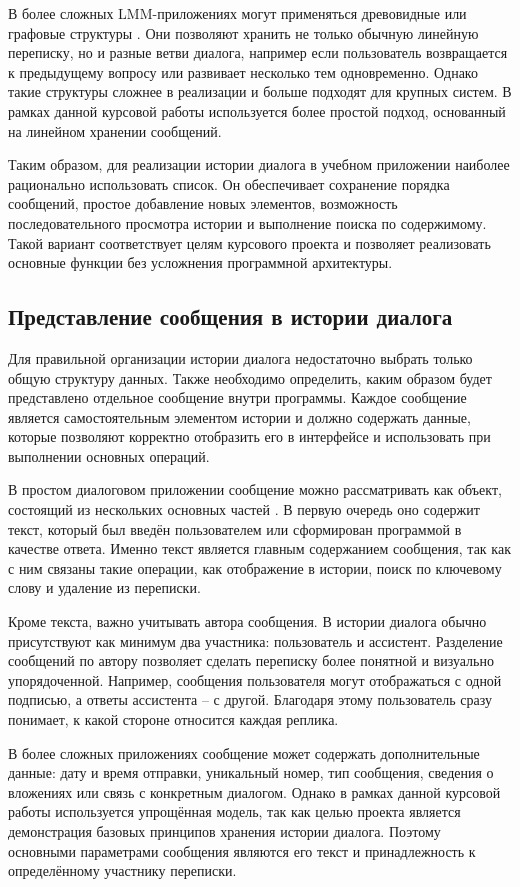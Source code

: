 \documentclass[12pt,a4paper]{article}
\begin{document}
В более сложных LMM-приложениях могут применяться древовидные или графовые структуры \cite{ref1,ref2}. Они позволяют хранить не только обычную линейную переписку, но и разные ветви диалога, например если пользователь возвращается к предыдущему вопросу или развивает несколько тем одновременно. Однако такие структуры сложнее в реализации и больше подходят для крупных систем. В рамках данной курсовой работы используется более простой подход, основанный на линейном хранении сообщений.

Таким образом, для реализации истории диалога в учебном приложении наиболее рационально использовать список. Он обеспечивает сохранение порядка сообщений, простое добавление новых элементов, возможность последовательного просмотра истории и выполнение поиска по содержимому. Такой вариант соответствует целям курсового проекта и позволяет реализовать основные функции без усложнения программной архитектуры.

\subsection{Представление сообщения в истории диалога}

Для правильной организации истории диалога недостаточно выбрать только общую структуру данных. Также необходимо определить, каким образом будет представлено отдельное сообщение внутри программы. Каждое сообщение является самостоятельным элементом истории и должно содержать данные, которые позволяют корректно отобразить его в интерфейсе и использовать при выполнении основных операций.

В простом диалоговом приложении сообщение можно рассматривать как объект, состоящий из нескольких основных частей \cite{ref6,ref7}. В первую очередь оно содержит текст, который был введён пользователем или сформирован программой в качестве ответа. Именно текст является главным содержанием сообщения, так как с ним связаны такие операции, как отображение в истории, поиск по ключевому слову и удаление из переписки.

Кроме текста, важно учитывать автора сообщения. В истории диалога обычно присутствуют как минимум два участника: пользователь и ассистент. Разделение сообщений по автору позволяет сделать переписку более понятной и визуально упорядоченной. Например, сообщения пользователя могут отображаться с одной подписью, а ответы ассистента -- с другой. Благодаря этому пользователь сразу понимает, к какой стороне относится каждая реплика.

В более сложных приложениях сообщение может содержать дополнительные данные: дату и время отправки, уникальный номер, тип сообщения, сведения о вложениях или связь с конкретным диалогом. Однако в рамках данной курсовой работы используется упрощённая модель, так как целью проекта является демонстрация базовых принципов хранения истории диалога. Поэтому основными параметрами сообщения являются его текст и принадлежность к определённому участнику переписки.
\end{document}
